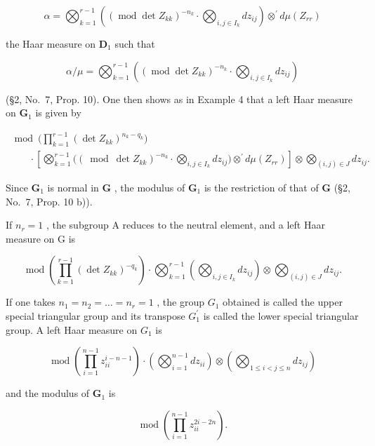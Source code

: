 \[
\alpha = \bigotimes_ {k = 1} ^ {r - 1} \left(\left(\operatorname{mod} \det Z _ {k k}\right) ^ {- n _ {k}} \cdot \bigotimes_ {i, j \in I _ {k}} d z _ {i j}\right) \otimes^ {\prime} d \mu \left(Z _ {r r}\right)
\]

the Haar measure on \(\mathbf{D}_1\) such that

\[
\alpha / \mu = \bigotimes_ {k = 1} ^ {r - 1} \left(\left(\operatorname{mod} \det Z _ {k k}\right) ^ {- n _ {k}} \cdot \bigotimes_ {i, j \in I _ {k}} d z _ {i j}\right)
\]

(§2, No.~7, Prop. 10). One then shows as in Example 4 that a left Haar measure on \(\mathbf{G}_1\) is given by

\[
\begin{array}{l} \bmod \Big (\prod_ {k = 1} ^ {r - 1} (\det Z _ {k k}) ^ {n _ {k} - q _ {k}} \Big) \\ \qquad \cdot \left[ \bigotimes_ {k = 1} ^ {r - 1} \big ((\bmod \det Z _ {k k}) ^ {- n _ {k}} \cdot \bigotimes_ {i, j \in I _ {k}} d z _ {i j} \big) \otimes^ {\prime} d \mu (Z _ {r r}) \right] \otimes \bigotimes_ {(i, j) \in J} d z _ {i j}. \end{array}
\]

Since \(\mathbf{G}_1\) is normal in \(\mathbf{G}\) , the modulus of \(\mathbf{G}_1\) is the restriction of that of \(\mathbf{G}\) (§2, No.~7, Prop. 10 b)).

If \(n_{r}=1\) , the subgroup A reduces to the neutral element, and a left Haar measure on G is

\[
\operatorname{mod} \left(\prod_ {k = 1} ^ {r - 1} (\det Z _ {k k}) ^ {- q _ {k}}\right) \cdot \bigotimes_ {k = 1} ^ {r - 1} \left(\bigotimes_ {i, j \in I _ {k}} d z _ {i j}\right) \otimes \bigotimes_ {(i, j) \in J} d z _ {i j}.
\]

If one takes \(n_{1}=n_{2}=\ldots=n_{r}=1\) , the group \(G_{1}\) obtained is called the upper special triangular group and its transpose \(G_{1}^{\prime}\) is called the lower special triangular group. A left Haar measure on \(G_{1}\) is

\[
\operatorname{mod} \left(\prod_ {i = 1} ^ {n - 1} z _ {i i} ^ {i - n - 1}\right) \cdot \left(\bigotimes_ {i = 1} ^ {n - 1} d z _ {i i}\right) \otimes \left(\bigotimes_ {1 \leqslant i <   j \leqslant n} d z _ {i j}\right)\tag{11}
\]

and the modulus of \(\mathbf{G}_1\) is

\[
\operatorname{mod} \left(\prod_ {i = 1} ^ {n - 1} z _ {i i} ^ {2 i - 2 n}\right).\tag{12}
\]

